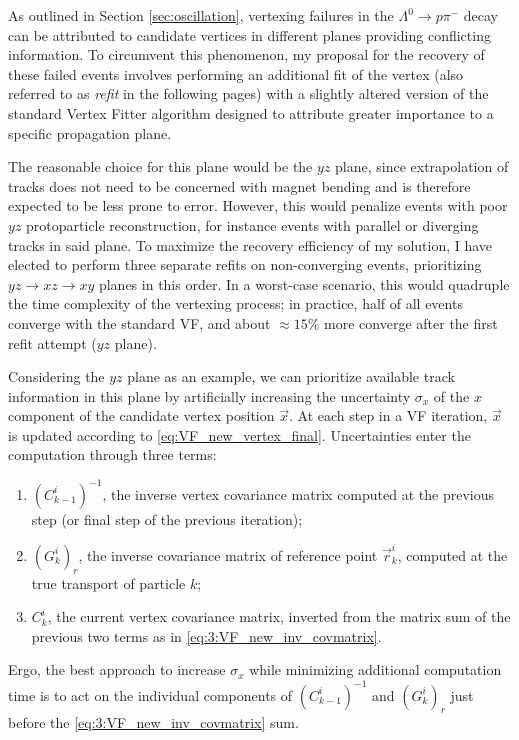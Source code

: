 As outlined in Section \ref{sec:oscillation}, vertexing failures in the $\Lambda^0 \rightarrow p\pi^-$ decay can be attributed to candidate vertices in different planes providing conflicting information.
To circumvent this phenomenon, my proposal for the recovery of these failed events involves performing an additional fit of the vertex (also referred to as \textit{refit} in the following pages) with a slightly altered version of the standard Vertex Fitter algorithm designed to attribute greater importance to a specific propagation plane.

The reasonable choice for this plane would be the $yz$ plane, since extrapolation of tracks does not need to be concerned with magnet bending and is therefore expected to be less prone to error.
However, this would penalize events with poor $yz$ protoparticle reconstruction, for instance events with parallel or diverging tracks in said plane.
To maximize the recovery efficiency of my solution, I have elected to perform three separate refits on non-converging events, prioritizing $yz \rightarrow xz \rightarrow xy$ planes in this order.
In a worst-case scenario, this would quadruple the time complexity of the vertexing process; in practice, half of all events converge with the standard VF, and about $\approx 15\%$ more converge after the first refit attempt ($yz$ plane).

Considering the $yz$ plane as an example, we can prioritize available track information in this plane by artificially increasing the uncertainty $\sigma_x$ of the $x$ component of the candidate vertex position $\vec{x}$.
At each step in a VF iteration, $\vec{x}$ is updated according to \eqref{eq:VF_new_vertex_final}.
Uncertainties enter the computation through three terms:
\begin{enumerate}
	\item ${(C_{k-1}^i)}^{-1}$, the inverse vertex covariance matrix computed at the previous step (or final step of the previous iteration);
	\item ${(G_k^i)}_r$, the inverse covariance matrix of reference point $\vec{r}_k^i$, computed at the true transport of particle $k$;
	\item $C_k^i$, the current vertex covariance matrix, inverted from the matrix sum of the previous two terms as in \eqref{eq:3:VF_new_inv_covmatrix}.
\end{enumerate}
Ergo, the best approach to increase $\sigma_x$ while minimizing additional computation time is to act on the individual components of ${(C_{k-1}^i)}^{-1}$ and ${(G_k^i)}_r$ just before the \eqref{eq:3:VF_new_inv_covmatrix} sum.

